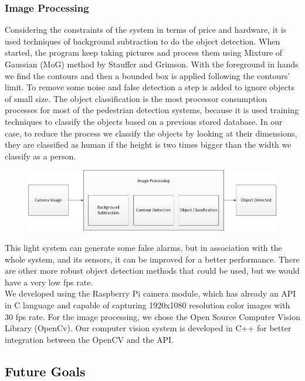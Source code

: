 \documentclass[journal,transmag]{IEEEtran}
\begin{document}
\subsubsection{Image Processing}
\- Considering the constraints of the system in terms of price and hardware, it is used techniques of background subtraction to do the object detection. When started, the program keep taking pictures and process them using Mixture of Gaussian (MoG) method by Stauffer and Grimson. With the foreground in hands we find the contours and then a bounded box is applied following the contours' limit. To remove some noise and false detection a step is added to ignore objects of small size. The object classification is the most processor consumption  processes for most of the pedestrian detection systems, because it is used training techniques to classify the objects based on a previous stored database. In our case, to reduce the process we classify the objects by looking at their dimensions, they are classified as human if the height is two times bigger than the width we classify as a person. \\
\begin{figure}[h!]
\centering
\includegraphics[scale=0.3]{imageprocessing}
\end{figure}	
\- This light system can generate some false alarms, but in association with the whole system, and its sensors, it can be improved for a better performance. There are other more robust object detection methods that could be used, but we would have a very low fps rate. \\
\- We developed using the Raspberry Pi camera module, which has already an API in C language and capable of capturing 1920x1080 resolution color images with 30 fps rate. For the image processing, we chose the Open Source Computer Vision Library (OpenCv). Our computer vision system is developed in C++ for better integration between the OpenCV and the API.\\

\subsection{Future Goals}
\end{document}
